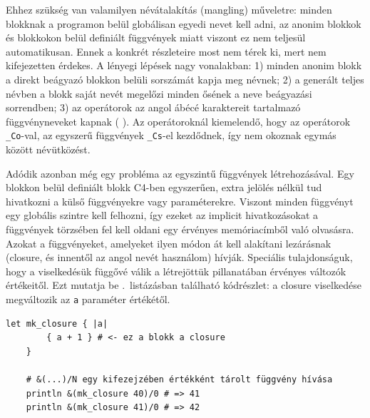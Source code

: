 Ehhez szükség van valamilyen névátalakítás (mangling) műveletre:
minden blokknak a programon belül globálisan egyedi nevet kell adni, az anonim blokkok és blokkokon belül definiált függvények miatt viszont ez nem teljesül automatikusan.
Ennek a konkrét részleteire most nem térek ki, mert nem kifejezetten érdekes.
A lényegi lépések nagy vonalakban: 1) minden anonim blokk a direkt beágyazó blokkon belüli sorszámát kapja meg névnek; 2) a generált teljes névben a blokk saját nevét megelőzi minden ősének a neve beágyazási sorrendben; 3) az operátorok az angol ábécé karaktereit tartalmazó függvényneveket kapnak (\pl {\tt +} ).
Az operátoroknál kiemelendő, hogy az operátorok {\tt \_Co}-val, az egyszerű függvények {\tt \_Cs}-el kezdődnek, így nem okoznak egymás között névütközést.

Adódik azonban még egy probléma az egyszintű függvények létrehozásával.
Egy blokkon belül definiált blokk C4-ben egyszerűen, extra jelölés nélkül tud hivatkozni a külső függvényekre vagy paraméterekre.
Viszont minden függvényt egy globális szintre kell felhozni, így ezeket az implicit hivatkozásokat a függvények törzsében fel kell oldani egy érvényes memóriacímből való olvasásra.
Azokat a függvényeket, amelyeket ilyen módon át kell alakítani lezárásnak (closure, és innentől az angol nevét használom) hívják.
Speciális tulajdonságuk, hogy a viselkedésük függővé válik a létrejöttük pillanatában érvényes változók értékeitől.
Ezt mutatja be .~listázásban található kódrészlet: a closure viselkedése megváltozik az {\tt a} paraméter értékétől.

\begin{lstlisting}[gobble=4,label=lst:closure-bhv,caption={A closure viselkedés bemutatása}]
    let mk_closure { |a|
        { a + 1 } # <- ez a blokk a closure
    }

    # &(...)/N egy kifezejzében értékként tárolt függvény hívása
    println &(mk_closure 40)/0 # => 41
    println &(mk_closure 41)/0 # => 42
\end{lstlisting}

